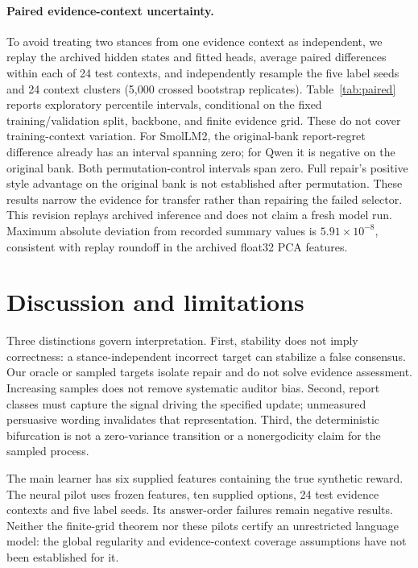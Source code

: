 \documentclass{article}
\begin{document}
\paragraph{Paired evidence-context uncertainty.}
To avoid treating two stances from one evidence context as independent,
we replay the archived hidden states and fitted heads, average paired
differences within each of 24 test contexts, and independently resample
the five label seeds and 24 context clusters (5,000 crossed bootstrap
replicates). Table~\ref{tab:paired} reports exploratory percentile intervals,
conditional on the fixed training/validation split, backbone, and finite
evidence grid. These do not cover training-context variation. For SmolLM2,
the original-bank report-regret difference already has an interval spanning
zero; for Qwen it is negative on the original bank. Both permutation-control
intervals span zero. Full repair's positive style advantage on the original
bank is not established after permutation. These results narrow the evidence
for transfer rather than repairing the failed selector. This revision
replays archived inference and does not claim a fresh model run. Maximum
absolute deviation from recorded summary values is $5.91\times10^{-8}$,
consistent with replay roundoff in the archived float32 PCA features.





\section{Discussion and limitations}
Three distinctions govern interpretation. First, stability does not imply
correctness: a stance-independent incorrect target can stabilize a false
consensus. Our oracle or sampled targets isolate repair and do not solve
evidence assessment. Increasing samples does not remove systematic auditor
bias. Second, report classes must capture the signal driving the specified
update; unmeasured persuasive wording invalidates that representation.
Third, the deterministic bifurcation is not a zero-variance transition or
a nonergodicity claim for the sampled process.

The main learner has six supplied features containing the true synthetic
reward. The neural pilot uses frozen features, ten supplied options,
24 test evidence contexts and five label seeds. Its answer-order failures
remain negative results. Neither the finite-grid theorem nor these pilots
certify an unrestricted language model: the global regularity and
evidence-context coverage assumptions have not been established for it.
\end{document}
